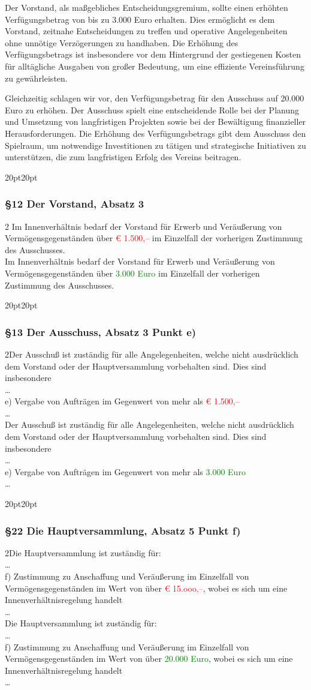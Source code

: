 \documentclass[10pt,a4paper,parskip=half]{scrartcl}
\newcommand{\new}[1]{\textcolor{Green}{#1}}
\newcommand{\old}[1]{\textcolor{Red}{#1}}
\newcommand{\change}[1]{
  \begin{adjustwidth}{20pt}{20pt}
    #1
  \end{adjustwidth}
}
\newcommand{\compare}[3]{\change{\subsubsection*{#1}\begin{multicols}{2}#2\columnbreak\\#3\end{multicols}}}
\begin{document}
Der Vorstand, als maßgebliches Entscheidungsgremium, sollte einen erhöhten Verfügungsbetrag von bis zu 3.000 Euro erhalten. Dies ermöglicht es dem Vorstand, zeitnahe Entscheidungen zu treffen und operative Angelegenheiten ohne unnötige Verzögerungen zu handhaben. Die Erhöhung des Verfügungsbetrags ist insbesondere vor dem Hintergrund der gestiegenen Kosten für alltägliche Ausgaben von großer Bedeutung, um eine effiziente Vereinsführung zu gewährleisten.

Gleichzeitig schlagen wir vor, den Verfügungsbetrag für den Ausschuss auf 20.000 Euro zu erhöhen. Der Ausschuss spielt eine entscheidende Rolle bei der Planung und Umsetzung von langfristigen Projekten sowie bei der Bewältigung finanzieller Herausforderungen. Die Erhöhung des Verfügungsbetrags gibt dem Ausschuss den Spielraum, um notwendige Investitionen zu tätigen und strategische Initiativen zu unterstützen, die zum langfristigen Erfolg des Vereins beitragen.

\compare{§12 Der Vorstand, Absatz 3}{
  Im Innenverhältnis bedarf der Vorstand für Erwerb und Veräußerung von Vermögensgegenständen über \old{€ 1.500,--} im Einzelfall der vorherigen Zustimmung des Ausschusses.
}{Im Innenverhältnis bedarf der Vorstand für Erwerb und Veräußerung von Vermögensgegenständen über \new{3.000 Euro} im Einzelfall der vorherigen Zustimmung des Ausschusses.}

\compare{§13 Der Ausschuss, Absatz 3 Punkt e)}
{Der Ausschuß ist zuständig für alle Angelegenheiten, welche nicht ausdrücklich dem
  Vorstand oder der Hauptversammlung vorbehalten sind. Dies sind insbesondere\\\dots\\
  e) Vergabe von Aufträgen im Gegenwert von mehr als \old{€ 1.500,--}\\\dots}
{Der Ausschuß ist zuständig für alle Angelegenheiten, welche nicht ausdrücklich dem
  Vorstand oder der Hauptversammlung vorbehalten sind. Dies sind insbesondere\\\dots\\
  e) Vergabe von Aufträgen im Gegenwert von mehr als \new{3.000 Euro}\\\dots}

\clearpage
\compare{§22 Die Hauptversammlung, Absatz 5 Punkt f)}
{Die Hauptversammlung ist zuständig für: \\ \dots\\
  f) Zustimmung zu Anschaffung und Veräußerung im Einzelfall von Vermögensgegenständen im Wert von über \old{€ 15.ooo,--}, wobei es sich um eine Innenverhältnisregelung handelt\\\dots}
{Die Hauptversammlung ist zuständig für: \\ \dots\\f) Zustimmung zu Anschaffung und Veräußerung im Einzelfall von Vermögensgegenständen im Wert von über \new{20.000 Euro}, wobei es sich um eine Innenverhältnisregelung handelt\\\dots}
\end{document}
